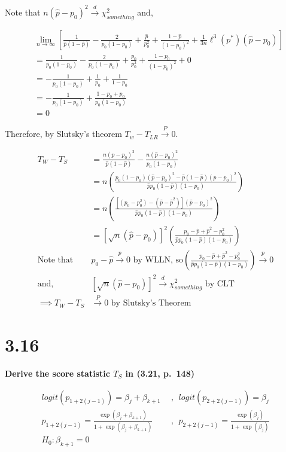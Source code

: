 \documentclass[
  letterpaper,
  DIV=11,
  numbers=noendperiod]{scrreprt}
\begin{document}
Note that \(n(\hat p- p_0)^2 \overset d \to \chi^2_{something}\) and,

\[\begin{aligned}
&\lim_{n \to \infty}\left[\frac 1 {\hat p (1-\hat p)}-\frac{2}{p_0 (1-p_0)}+\frac{\hat p}{p_0^2}+ \frac{1-\hat p}{(1-p_0)^2}+ \frac 1 {3n} \ell^3 (p^*)(\hat p - p_0) \right] \\
&=\frac 1 {p_0 (1-p_0)}-\frac{2}{p_0 (1-p_0)}+\frac{p_0}{p_0^2}+ \frac{1-p_0}{(1-p_0)^2}+0\\
&=-\frac{1}{p_0 (1-p_0)}+\frac{1}{p_0}+ \frac{1}{1-p_0}\\
&= -\frac{1}{p_0 (1-p_0)}+\frac{1-p_0+p_0}{p_0(1-p_0)}\\
&= 0
\end{aligned}
\]

Therefore, by Slutsky's theorem \(T_w - T_{LR} \overset P \to 0\).

\[\begin{aligned}
T_W - T_S &= \frac{n(\hat p- p_0)^2}{\hat p (1-\hat p)} - \frac{n(\hat p- p_0)^2}{p_0 (1-p_0)}\\
&= n \left(\frac{p_0 (1-p_0)(\hat p- p_0)^2-\hat p (1-\hat p)(\hat p- p_0)^2}{\hat p p_0(1-\hat p) (1-p_0)} \right)\\
&= n \left(\frac{[(p_0-p_0^2)-(\hat p-\hat p^2)](\hat p- p_0)^2}{\hat p p_0(1-\hat p) (1-p_0)} \right)\\
&= \left[\sqrt n (\hat p- p_0) \right]^2\left(\frac{p_0 -\hat p + \hat p^2-p_0^2}{\hat p p_0(1-\hat p) (1-p_0)} \right)\\
\text{Note that } &p_0 - \hat p \overset p \to 0 \text{ by WLLN, so}
\left(\frac{p_0 -\hat p + \hat p^2-p_0^2}{\hat p p_0(1-\hat p) (1-p_0)} \right) \overset p \to 0\\
\text{and, }&\left[\sqrt n (\hat p- p_0) \right]^2 \overset d \to \chi^2_{something} \text{ by CLT} \\
\implies T_W - T_S &\overset P \to 0 \text{ by Slutsky's Theorem}
\end{aligned}\]

\newpage

\hypertarget{section-24}{%
\section{3.16}\label{section-24}}

\textbf{Derive the score statistic \(T_S\) in (3.21, p.~148)}

\[\begin{aligned}
logit(p_{1+2(j-1)}) = \beta_j + \beta_{k+1} ~~&,~~logit(p_{2+2(j-1)}) = \beta_j\\
p_{1+2(j-1)} =  \frac{\exp(\beta_j + \beta_{k+1})}{1+\exp(\beta_j + \beta_{k+1})}~~
&,~~p_{2+2(j-1)} =  \frac{\exp(\beta_j)}{1+\exp(\beta_j)} \\
H_0: \beta_{k+1} = 0
\end{aligned}\]
\end{document}
